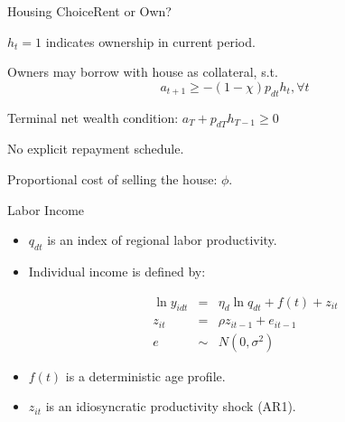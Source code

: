 \documentclass[12pt,english, aspectratio=169]{beamer}
\begin{document}
\begin{longv}
\begin{frame}{Housing Choice}{Rent or Own?}

\begin{midi}
\item $h_{t}=1$ indicates ownership in current period.
\item Owners may borrow with house as collateral, s.t. 
\[a_{t+1}\geq-(1-\chi)p_{dt}h_{t},\forall t\]
\item Terminal net wealth condition: $a_{T}+p_{dT}h_{T-1}\geq0$
\item No explicit repayment schedule.
\item Proportional cost of selling the house: $\phi$.
\end{midi}
\end{frame}
\end{longv}

\begin{frame}{Labor Income}

\begin{itemize}
\item $q_{dt}$ is an index of regional labor productivity.
\item Individual income is defined by:

\begin{eqnarray*}
\ln y_{idt} & = & \eta_{d}\ln q_{dt}+f(t)+z_{it}\\
z_{it} & = & \rho z_{it-1}+e_{it-1}\\
e & \sim & N(0,\sigma^{2})
\end{eqnarray*}

\item $f(t)$ is a deterministic age profile.
\item $z_{it}$ is an idiosyncratic productivity shock (AR1).
\end{itemize}
\end{frame}
\end{document}
